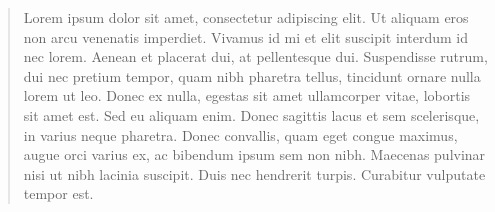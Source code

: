 \begin{abstract}
    Lorem ipsum dolor sit amet, consectetur adipiscing elit. Ut aliquam eros non arcu venenatis imperdiet. Vivamus id mi et elit suscipit interdum id nec lorem. Aenean et placerat dui, at pellentesque dui. Suspendisse rutrum, dui nec pretium tempor, quam nibh pharetra tellus, tincidunt ornare nulla lorem ut leo. Donec ex nulla, egestas sit amet ullamcorper vitae, lobortis sit amet est. Sed eu aliquam enim. Donec sagittis lacus et sem scelerisque, in varius neque pharetra. Donec convallis, quam eget congue maximus, augue orci varius ex, ac bibendum ipsum sem non nibh. Maecenas pulvinar nisi ut nibh lacinia suscipit. Duis nec hendrerit turpis. Curabitur vulputate tempor est. 
\end{abstract}
